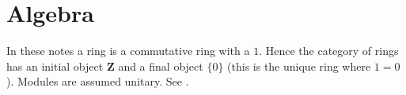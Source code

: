 \section{Algebra}
\label{section-algebra}

\noindent
In these notes a ring is a commutative ring with a $1$. Hence the
category of rings has an initial object $\mathbf{Z}$ and a final
object $\{0\}$ (this is the unique ring where $1=0$). Modules are 
assumed unitary. See \cite{E}.







